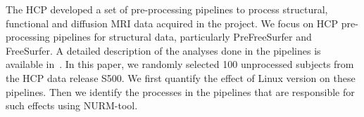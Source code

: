 \documentclass[a4paper,num-refs]{oup-contemporary}
\begin{document}
The HCP developed a set of pre-processing pipelines to process structural,
functional and diffusion MRI data acquired in the project. We focus on HCP
pre-processing pipelines for structural data, particularly PreFreeSurfer
and FreeSurfer. A detailed description of the analyses done in the
pipelines is available in~\cite{glasser2013}. 
In this paper, we randomly selected 100 unprocessed subjects from the HCP data release S500.
We first quantify the effect of Linux version on
these pipelines. Then we identify the processes in the
pipelines that are responsible for such effects using NURM-tool.


\end{document}
